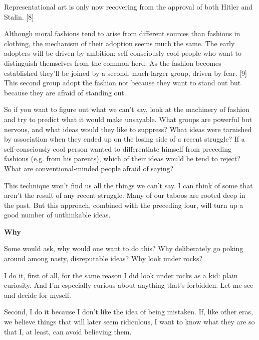                   Representational art is only now recovering from the approval
                  of both Hitler and Stalin. [8]

Although moral
                  fashions tend to arise from different sources than fashions in
                  clothing, the mechanism of their adoption seems much the same.
                  The early adopters will be driven by ambition:
                  self-consciously cool people who want to distinguish
                  themselves from the common herd. As the fashion becomes
                  established they'll be joined by a second, much larger group,
                  driven by fear. [9] This second group adopt the fashion not
                  because they want to stand out but because they are afraid of
                  standing out.

So if you want to figure out what we
                  can't say, look at the machinery of fashion and try to predict
                  what it would make unsayable. What groups are powerful but
                  nervous, and what ideas would they like to suppress? What
                  ideas were tarnished by association when they ended up on the
                  losing side of a recent struggle? If a self-consciously cool
                  person wanted to differentiate himself from preceding fashions
                  (e.g. from his parents), which of their ideas would he tend to
                  reject? What are conventional-minded people afraid of
                  saying?

This technique won't find us all the things
                  we can't say. I can think of some that aren't the result of
                  any recent struggle. Many of our taboos are rooted deep in the
                  past. But this approach, combined with the preceding four,
                  will turn up a good number of unthinkable ideas.

\textbf{Why}

Some would ask, why would one want to do this?
                  Why deliberately go poking around among nasty, disreputable
                  ideas? Why look under rocks?

I do it, first of all,
                  for the same reason I did look under rocks as a kid: plain
                  curiosity. And I'm especially curious about anything that's
                  forbidden. Let me see and decide for myself.

Second,
                  I do it because I don't like the idea of being mistaken. If,
                  like other eras, we believe things that will later seem
                  ridiculous, I want to know what they are so that I, at least,
                  can avoid believing them.

